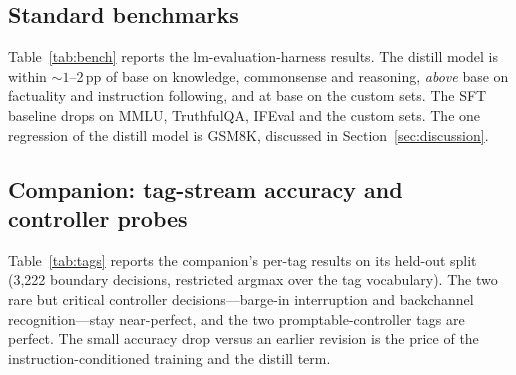 \documentclass[conference]{IEEEtran}
\begin{document}
\subsection{Standard benchmarks}
Table~\ref{tab:bench} reports the lm-evaluation-harness results. The distill model
is within ${\sim}1$--2\,pp of base on knowledge, commonsense and reasoning,
\emph{above} base on factuality and instruction following, and at base on the
custom sets. The SFT baseline drops on MMLU, TruthfulQA, IFEval and the custom
sets. The one regression of the distill model is GSM8K, discussed in
Section~\ref{sec:discussion}.

\begin{table}[t]
\centering
\caption{Standard benchmarks (lm-evaluation-harness 0.4.12; subsets as noted).}
\label{tab:bench}
\footnotesize
{}
\end{table}

\subsection{Companion: tag-stream accuracy and controller probes}
Table~\ref{tab:tags} reports the companion's per-tag results on its held-out split
(3{,}222 boundary decisions, restricted argmax over the tag vocabulary). The two
rare but critical controller decisions---barge-in interruption and backchannel
recognition---stay near-perfect, and the two promptable-controller tags are
perfect. The small accuracy drop versus an earlier revision is the price of the
instruction-conditioned training and the distill term.
\end{document}
